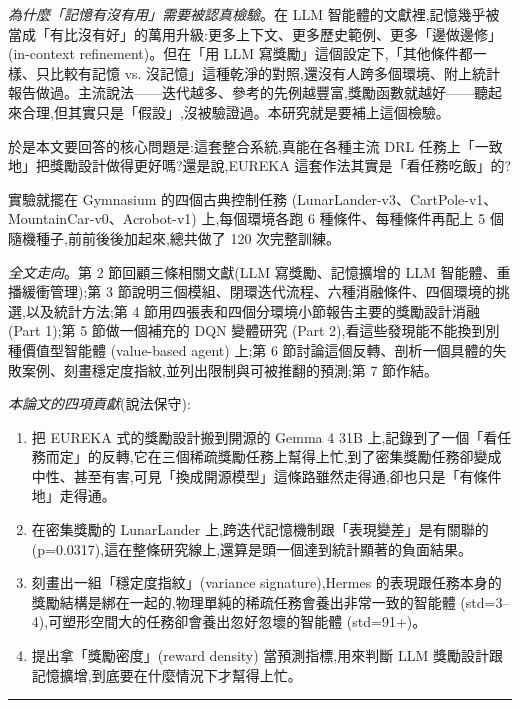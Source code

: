 \emph{為什麼「記憶有沒有用」需要被認真檢驗}。在 LLM 智能體的文獻裡,記憶幾乎被當成「有比沒有好」的萬用升級:更多上下文、更多歷史範例、更多「邊做邊修」(in-context refinement)。但在「用 LLM 寫獎勵」這個設定下,「其他條件都一樣、只比較有記憶 vs. 沒記憶」這種乾淨的對照,還沒有人跨多個環境、附上統計報告做過。主流說法------迭代越多、參考的先例越豐富,獎勵函數就越好------聽起來合理,但其實只是「假設」,沒被驗證過。本研究就是要補上這個檢驗。

於是本文要回答的核心問題是:這套整合系統,真能在各種主流 DRL 任務上「一致地」把獎勵設計做得更好嗎?還是說,EUREKA 這套作法其實是「看任務吃飯」的?

實驗就擺在 Gymnasium 的四個古典控制任務 (LunarLander-v3、CartPole-v1、MountainCar-v0、Acrobot-v1) 上,每個環境各跑 6 種條件、每種條件再配上 5 個隨機種子,前前後後加起來,總共做了 120 次完整訓練。

\emph{全文走向}。第 2 節回顧三條相關文獻(LLM 寫獎勵、記憶擴增的 LLM 智能體、重播緩衝管理);第 3 節說明三個模組、閉環迭代流程、六種消融條件、四個環境的挑選,以及統計方法;第 4 節用四張表和四個分環境小節報告主要的獎勵設計消融 (Part 1);第 5 節做一個補充的 DQN 變體研究 (Part 2),看這些發現能不能換到別種價值型智能體 (value-based agent) 上;第 6 節討論這個反轉、剖析一個具體的失敗案例、刻畫穩定度指紋,並列出限制與可被推翻的預測;第 7 節作結。

\emph{本論文的四項貢獻}(說法保守):

\begin{enumerate}
\def\labelenumi{\arabic{enumi}.}
\tightlist
\item
  把 EUREKA 式的獎勵設計搬到開源的 Gemma 4 31B 上,記錄到了一個「看任務而定」的反轉,它在三個稀疏獎勵任務上幫得上忙,到了密集獎勵任務卻變成中性、甚至有害,可見「換成開源模型」這條路雖然走得通,卻也只是「有條件地」走得通。
\item
  在密集獎勵的 LunarLander 上,跨迭代記憶機制跟「表現變差」是有關聯的 (p=0.0317),這在整條研究線上,還算是頭一個達到統計顯著的負面結果。
\item
  刻畫出一組「穩定度指紋」(variance signature),Hermes 的表現跟任務本身的獎勵結構是綁在一起的,物理單純的稀疏任務會養出非常一致的智能體 (std=3--4),可塑形空間大的任務卻會養出忽好忽壞的智能體 (std=91+)。
\item
  提出拿「獎勵密度」(reward density) 當預測指標,用來判斷 LLM 獎勵設計跟記憶擴增,到底要在什麼情況下才幫得上忙。
\end{enumerate}

\begin{center}\rule{0.5\linewidth}{0.5pt}\end{center}

